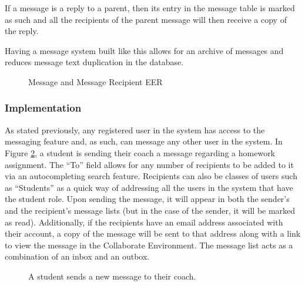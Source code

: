 If a message is a reply to a parent, then its entry in the message table is marked as such and all the recipients of the parent message will then receive a copy of the reply.

Having a message system built like this allows for an archive of messages and reduces message text duplication in the database.

\begin{figure}[h!]
	\centering
	\caption{Message and Message Recipient EER}
	\label{fig:er-message}
\end{figure}

\subsubsection{Implementation}
As stated previously, any registered user in the system has access to the messaging feature and, as such, can message any other user in the system. In Figure \ref{fig:screens-message-new}, a student is sending their coach a message regarding a homework assignment. The ``To'' field allows for any number of recipients to be added to it via an autocompleting search feature. Recipients can also be classes of users such as ``Students'' as a quick way of addressing all the users in the system that have the student role. Upon sending the message, it will appear in both the sender's and the recipient's message lists (but in the case of the sender, it will be marked as read). Additionally, if the recipients have an email address associated with their account, a copy of the message will be sent to that address along with a link to view the message in the Collaborate Environment. The message list acts as a combination of an inbox and an outbox.

\begin{figure}[h!]
	\centering
	\caption{A student sends a new message to their coach.}
	\label{fig:screens-message-new}
\end{figure}

